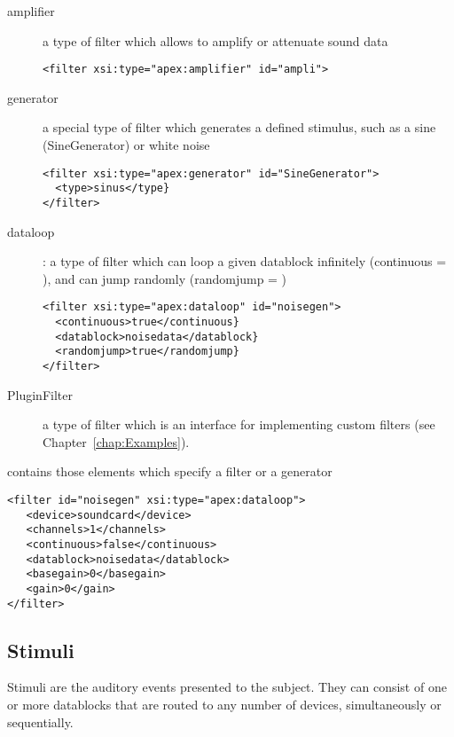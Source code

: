\begin{description}
\item[amplifier] a type of filter which allows to amplify or attenuate sound data

\begin{lstlisting}
<filter xsi:type="apex:amplifier" id="ampli">
\end{lstlisting}

\item[generator] a special type of filter which generates a defined stimulus, such as a sine (SineGenerator) or white noise

\begin{lstlisting}
<filter xsi:type="apex:generator" id="SineGenerator">
  <type>sinus</type}
</filter>
\end{lstlisting}

\item[dataloop]: a type of filter which can loop a given datablock infinitely (continuous = ), and can jump randomly (randomjump = )

\begin{lstlisting}
<filter xsi:type="apex:dataloop" id="noisegen">
  <continuous>true</continuous}
  <datablock>noisedata</datablock}
  <randomjump>true</randomjump}
</filter>
\end{lstlisting}

\item[PluginFilter] a type of filter which is an interface for implementing custom
filters (see Chapter~\ref{chap:Examples}).
\end{description}


 contains those elements which specify a filter or
a generator

\begin{lstlisting}
<filter id="noisegen" xsi:type="apex:dataloop">
   <device>soundcard</device>
   <channels>1</channels>
   <continuous>false</continuous>
   <datablock>noisedata</datablock>
   <basegain>0</basegain>
   <gain>0</gain>
</filter>
\end{lstlisting}



\subsection{Stimuli}
\label{sec:Stimuli}

 Stimuli are the auditory events presented to the
subject. They can consist of one or more datablocks that are
routed to any number of devices, simultaneously or sequentially.

